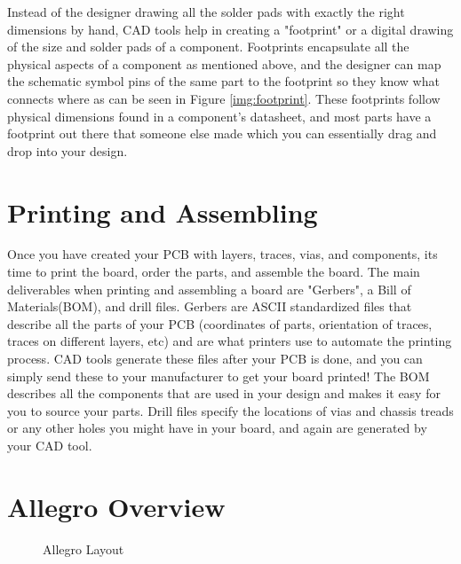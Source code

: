Instead of the designer drawing all the solder pads with exactly the right dimensions by hand, CAD tools help in creating a "footprint" or a
digital drawing of the size and solder pads of a component. Footprints encapsulate all the physical aspects of a component as mentioned above,
and the designer can map the schematic symbol pins of the same part to the footprint so they know what connects where as can be seen in Figure \ref{img:footprint}.
These footprints follow physical dimensions found in a component's datasheet, and most parts have a footprint out there that someone else made which
you can essentially drag and drop into your design.

\section{Printing and Assembling}
Once you have created your PCB with layers, traces, vias, and components, its time to print the board, order the parts, and assemble the board.
The main deliverables when printing and assembling a board are "Gerbers", a Bill of Materials(BOM), and drill files. Gerbers are ASCII standardized
files that describe all the parts of your PCB (coordinates of parts, orientation of traces, traces on different layers, etc) and are what
printers use to automate the printing process. CAD tools generate these files after your PCB is done, and you can simply send these to your
manufacturer to get your board printed! The BOM describes all the components that are used in your design and makes it easy for you to source
your parts. Drill files specify the locations of vias and chassis treads or any other holes you might have in your board, and again are generated
by your CAD tool.

\section{Allegro Overview}
\begin{figure}[H]
  \centering
\caption{Allegro Layout}
\label{img:layoutfull}
\end{figure}

